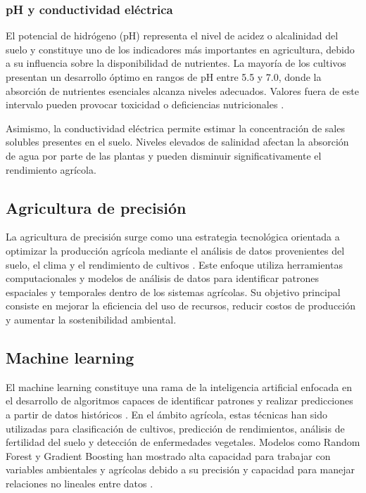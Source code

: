 \documentclass[12pt]{article}
\begin{document}
\subsubsection{pH y conductividad eléctrica}
El potencial de hidrógeno (pH) representa el nivel de acidez o alcalinidad del suelo y constituye uno de los indicadores más importantes en agricultura, debido a su influencia sobre la disponibilidad de nutrientes. La mayoría de los cultivos presentan un desarrollo óptimo en rangos de pH entre 5.5 y 7.0, donde la absorción de nutrientes esenciales alcanza niveles adecuados. Valores fuera de este intervalo pueden provocar toxicidad o deficiencias nutricionales \citep{weil_brady_2017}.

Asimismo, la conductividad eléctrica permite estimar la concentración de sales solubles presentes en el suelo. Niveles elevados de salinidad afectan la absorción de agua por parte de las plantas y pueden disminuir significativamente el rendimiento agrícola.

\subsection{Agricultura de precisión}
La agricultura de precisión surge como una estrategia tecnológica orientada a optimizar la producción agrícola mediante el análisis de datos provenientes del suelo, el clima y el rendimiento de cultivos \citep{gebbers_2010}. Este enfoque utiliza herramientas computacionales y modelos de análisis de datos para identificar patrones espaciales y temporales dentro de los sistemas agrícolas. Su objetivo principal consiste en mejorar la eficiencia del uso de recursos, reducir costos de producción y aumentar la sostenibilidad ambiental.

\subsection{Machine learning}
El machine learning constituye una rama de la inteligencia artificial enfocada en el desarrollo de algoritmos capaces de identificar patrones y realizar predicciones a partir de datos históricos \citep{mucherino_2009}. En el ámbito agrícola, estas técnicas han sido utilizadas para clasificación de cultivos, predicción de rendimientos, análisis de fertilidad del suelo y detección de enfermedades vegetales. Modelos como Random Forest y Gradient Boosting han mostrado alta capacidad para trabajar con variables ambientales y agrícolas debido a su precisión y capacidad para manejar relaciones no lineales entre datos \citep{sharma_2021}.
\end{document}
